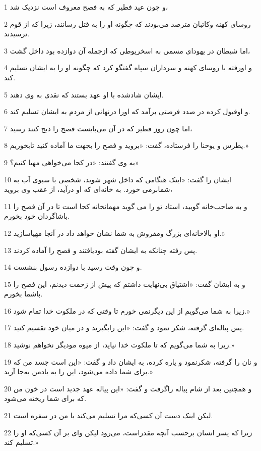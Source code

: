 \par 1 و چون عید فطیر که به فصح معروف است نزدیک شد،
\par 2 روسای کهنه وکاتبان مترصد می‌بودند که چگونه او را به قتل رسانند، زیرا که از قوم ترسیدند.
\par 3 اما شیطان در یهودای مسمی به اسخریوطی که از‌جمله آن دوازده بود داخل گشت،
\par 4 و اورفته با روسای کهنه و سرداران سپاه گفتگو کرد که چگونه او را به ایشان تسلیم کند.
\par 5 ایشان شادشده با او عهد بستند که نقدی به وی دهند.
\par 6 و اوقبول کرده در صدد فرصتی برآمد که اورا درنهانی از مردم به ایشان تسلیم کند.
\par 7 اما چون روز فطیر که در آن می‌بایست فصح را ذبح کنند رسید،
\par 8 پطرس و یوحنا را فرستاده، گفت: «بروید و فصح را بجهت ما آماده کنید تابخوریم.»
\par 9 به وی گفتند: «در کجا می‌خواهی مهیا کنیم؟»
\par 10 ایشان را گفت: «اینک هنگامی که داخل شهر شوید، شخصی با سبوی آب به شمابرمی خورد. به خانه‌ای که او درآید، از عقب وی بروید،
\par 11 و به صاحب‌خانه گویید، استاد تو را می گوید مهمانخانه کجا است تا در آن فصح را باشاگردان خود بخورم.
\par 12 او بالاخانه‌ای بزرگ ومفروش به شما نشان خواهد داد در آنجا مهیاسازید.»
\par 13 پس رفته چنانکه به ایشان گفته بودیافتند و فصح را آماده کردند.
\par 14 و چون وقت رسید با دوازده رسول بنشست.
\par 15 و به ایشان گفت: «اشتیاق بی‌نهایت داشتم که پیش از زحمت دیدنم، این فصح را باشما بخورم.
\par 16 زیرا به شما می‌گویم از این دیگرنمی خورم تا وقتی که در ملکوت خدا تمام شود.»
\par 17 پس پیاله‌ای گرفته، شکر نمود و گفت: «این رابگیرید و در میان خود تقسیم کنید.
\par 18 زیرا به شما می‌گویم که تا ملکوت خدا نیاید، از میوه مودیگر نخواهم نوشید.»
\par 19 و نان را گرفته، شکرنمود و پاره کرده، به ایشان داد و گفت: «این است جسد من که برای شما داده می‌شود، این را به یادمن به‌جا آرید.»
\par 20 و همچنین بعد از شام پیاله راگرفت و گفت: «این پیاله عهد جدید است در خون من که برای شما ریخته می‌شود.
\par 21 لیکن اینک دست آن کسی‌که مرا تسلیم می‌کند با من در سفره است.
\par 22 زیرا که پسر انسان برحسب آنچه مقدراست، می‌رود لیکن وای بر آن کسی‌که او را تسلیم کند.»
